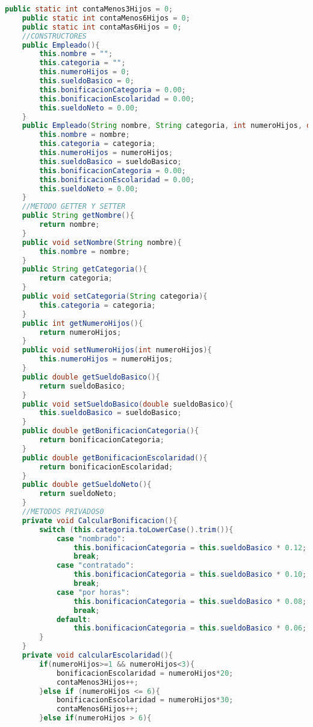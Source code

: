 \documentclass{article}
\begin{document}
\begin{itemize}
\begin{itemize}
\begin{lstlisting}[language=java]
    public static int contaMenos3Hijos = 0;
    public static int contaMenos6Hijos = 0;
    public static int contaMas6Hijos = 0;
    //CONSTRUCTORES
    public Empleado(){
        this.nombre = "";
        this.categoria = "";
        this.numeroHijos = 0;
        this.sueldoBasico = 0;
        this.bonificacionCategoria = 0.00;
        this.bonificacionEscolaridad = 0.00;
        this.sueldoNeto = 0.00;
    }
    public Empleado(String nombre, String categoria, int numeroHijos, double sueldoBasico){
        this.nombre = nombre;
        this.categoria = categoria;
        this.numeroHijos = numeroHijos;
        this.sueldoBasico = sueldoBasico;
        this.bonificacionCategoria = 0.00;
        this.bonificacionEscolaridad = 0.00;
        this.sueldoNeto = 0.00;
    }
    //METODO GETTER Y SETTER
    public String getNombre(){
        return nombre;
    }
    public void setNombre(String nombre){
        this.nombre = nombre;
    }
    public String getCategoria(){
        return categoria;
    }
    public void setCategoria(String categoria){
        this.categoria = categoria;
    }
    public int getNumeroHijos(){
        return numeroHijos;
    }
    public void setNumeroHijos(int numeroHijos){
        this.numeroHijos = numeroHijos;
    }
    public double getSueldoBasico(){
        return sueldoBasico;
    }
    public void setSueldoBasico(double sueldoBasico){
        this.sueldoBasico = sueldoBasico;
    }
    public double getBonificacionCategoria(){
        return bonificacionCategoria;
    }
    public double getBonificacionEscolaridad(){
        return bonificacionEscolaridad;
    }
    public double getSueldoNeto(){
        return sueldoNeto;
    }
    //METODOS PRIVADOS0
    private void CalcularBonificacion(){
        switch (this.categoria.toLowerCase().trim()){
            case "nombrado":
                this.bonificacionCategoria = this.sueldoBasico * 0.12;
                break;
            case "contratado":
                this.bonificacionCategoria = this.sueldoBasico * 0.10;
                break;
            case "por horas":
                this.bonificacionCategoria = this.sueldoBasico * 0.08;
                break;        
            default:
                this.bonificacionCategoria = this.sueldoBasico * 0.06;
        }
    }
    private void calcularEscolaridad(){
        if(numeroHijos>=1 && numeroHijos<3){
            bonificacionEscolaridad = numeroHijos*20;
            contaMenos3Hijos++;
        }else if (numeroHijos <= 6){
            bonificacionEscolaridad = numeroHijos*30;
            contaMenos6Hijos++;
        }else if(numeroHijos > 6){

\end{lstlisting}
\end{itemize}
\end{itemize}
\end{document}
